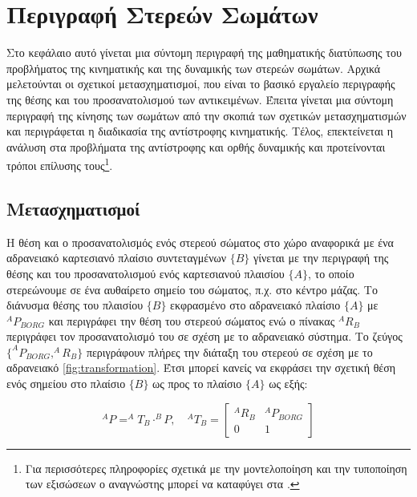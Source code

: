 \chapter{Περιγραφή Στερεών Σωμάτων}

Στο κεφάλαιο αυτό γίνεται μια σύντομη περιγραφή της μαθηματικής διατύπωσης του προβλήματος της κινηματικής και της δυναμικής των στερεών σωμάτων. Αρχικά μελετούνται οι σχετικοί μετασχηματισμοί, που είναι το βασικό εργαλείο περιγραφής της θέσης και του προσανατολισμού των αντικειμένων. Έπειτα γίνεται μια σύντομη περιγραφή της κίνησης των σωμάτων από την σκοπιά των σχετικών μετασχηματισμών και περιγράφεται η διαδικασία της αντίστροφης κινηματικής. Τέλος, επεκτείνεται η ανάλυση στα προβλήματα της αντίστροφης και ορθής δυναμικής και προτείνονται τρόποι επίλυσης τους\footnote{Για περισσότερες πληροφορίες σχετικά με την μοντελοποίηση και την τυποποίηση των εξισώσεων ο αναγνώστης μπορεί να καταφύγει στα \cite{craig95, murray94}.}.

\section{Μετασχηματισμοί}

Η θέση και ο προσανατολισμός ενός στερεού σώματος στο χώρο αναφορικά με ένα αδρανειακό καρτεσιανό πλαίσιο συντεταγμένων $\{Β\}$ γίνεται με την περιγραφή της θέσης και του προσανατολισμού ενός καρτεσιανού πλαισίου $\{Α\}$, το οποίο στερεώνουμε σε ένα αυθαίρετο σημείο του σώματος, π.χ. στο κέντρο μάζας. Το διάνυσμα θέσης του πλαισίου $\{Β\}$ εκφρασμένο στο αδρανειακό πλαίσιο $\{Α\}$ με $^AP_{BORG}$ και περιγράφει την θέση του στερεού σώματος ενώ ο πίνακας $^AR_B$ περιγράφει τον προσανατολισμό του σε σχέση με το αδρανειακό σύστημα. Το ζεύγος $\{^AP_{BORG}, ^AR_B\}$ περιγράφουν πλήρες την διάταξη του στερεού σε σχέση με το αδρανειακό \ref{fig:transformation}. Έτσι μπορεί κανείς να εκφράσει την σχετική θέση ενός σημείου στο πλαίσιο $\{Β\}$ ως προς το πλαίσιο  $\{Α\}$ ως εξής:

\begin{equation}
    ^AP = ^AT_B \cdot ^BP, \quad
    ^AT_B =
    \begin{bmatrix}
        ^AR_B & ^AP_{BORG}\\
        0 & 1
    \end{bmatrix}
\end{equation}

